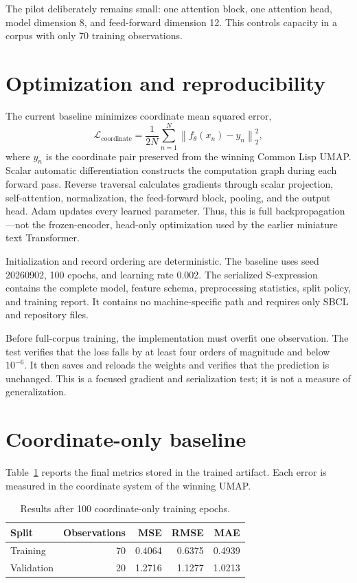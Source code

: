 \documentclass[12pt]{article}
\begin{document}
The pilot deliberately remains small: one attention block, one attention head,
model dimension 8, and feed-forward dimension 12.  This controls capacity in a
corpus with only 70 training observations.

\section{Optimization and reproducibility}

The current baseline minimizes coordinate mean squared error,
\[
  \mathcal{L}_{\mathrm{coordinate}}
  =\frac{1}{2N}\sum_{n=1}^{N}
    \left\|f_{\theta}(x_n)-y_n\right\|_2^2,
\]
where $y_n$ is the coordinate pair preserved from the winning Common Lisp UMAP.
Scalar automatic differentiation constructs the computation graph during each
forward pass.  Reverse traversal calculates gradients through scalar projection,
self-attention, normalization, the feed-forward block, pooling, and the output
head.  Adam updates every learned parameter.  Thus, this is full
backpropagation---not the frozen-encoder, head-only optimization used by the
earlier miniature text Transformer.

Initialization and record ordering are deterministic.  The baseline uses seed
20260902, 100 epochs, and learning rate 0.002.  The serialized S-expression
contains the complete model, feature schema, preprocessing statistics, split
policy, and training report.  It contains no machine-specific path and requires
only SBCL and repository files.

Before full-corpus training, the implementation must overfit one observation.
The test verifies that the loss falls by at least four orders of magnitude and
below $10^{-6}$.  It then saves and reloads the weights and verifies that the
prediction is unchanged.  This is a focused gradient and serialization test; it
is not a measure of generalization.

\section{Coordinate-only baseline}

Table~\ref{tab:baseline} reports the final metrics stored in the trained artifact.
Each error is measured in the coordinate system of the winning UMAP.

\begin{table}[ht]
\centering
\caption{Results after 100 coordinate-only training epochs.}
\label{tab:baseline}
\begin{tabular}{lrrrr}
\toprule
Split & Observations & MSE & RMSE & MAE \\
\midrule
Training & 70 & 0.4064 & 0.6375 & 0.4939 \\
Validation & 20 & 1.2716 & 1.1277 & 1.0213 \\
\bottomrule
\end{tabular}
\end{table}
\end{document}
